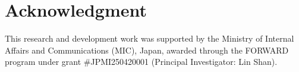 \documentclass[conference]{IEEEtran}
\begin{document}
\section*{Acknowledgment}

This research and development work was supported by the Ministry of Internal Affairs and Communications (MIC), Japan, awarded through the FORWARD program under grant \#JPMI250420001 (Principal Investigator: Lin Shan).



\end{document}
